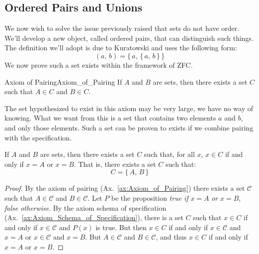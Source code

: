     \subsection{Ordered Pairs and Unions}
        We now wish to solve the issue previously raised that sets do
        not have order. We'll develop a new object, called ordered pairs, that
        can distinguish such things. The definition we'll adopt is due to
        Kuratowski and uses the following form:
        \begin{equation}
            (a,\,b)=\big\{\,a,\,\{\,a,\,b\,\}\,\big\}
        \end{equation}
        We now prove such a set exists within the framework of ZFC.
        \begin{faxiom}{Axiom of Pairing}{Axiom_of_Pairing}
            If $A$ and $B$ are sets, then there exists a set $C$ such that
            $A\in{C}$ and $B\in{C}$.
        \end{faxiom}
        The set hypothesized to exist in this axiom may be very large, we have
        no way of knowing. What we want from this is a set that contains two
        elements $a$ and $b$, and only those elements. Such a set can be proven
        to exists if we combine pairing with the specification.
        \begin{theorem}
            \label{thm:Existence_of_Set_Built_from_Two_Sets}%
            If $A$ and $B$ are sets, then there exists a set $C$ such that,
            for all $x$, $x\in{C}$ if and only if $x=A$ or $x=B$. That is,
            there exists a set $C$ such that:
            \begin{equation}
                C=\{\,A,\,B\,\}
            \end{equation}
        \end{theorem}
        \begin{proof}
            By the axiom of pairing (Ax.~\ref{ax:Axiom_of_Pairing}) there
            exists a set $\mathcal{C}$ such that $A\in\mathcal{C}$ and
            $B\in\mathcal{C}$. Let $P$ be the proposition
            \textit{true if} $x=A$ \textit{or} $x=B$, \textit{false otherwise}.
            By the axiom schema of specification
            (Ax.~\ref{ax:Axiom_Schema_of_Specification}), there is a set
            $C$ such that $x\in{C}$ if and only if $x\in\mathcal{C}$ and
            $P(x)$ is true. But then $x\in{C}$ if and only if
            $x\in\mathcal{C}$ and $x=A$ or $x\in\mathcal{C}$ and $x=B$.
            But $A\in\mathcal{C}$ and $B\in\mathcal{C}$, and thus
            $x\in{C}$ if and only if $x=A$ or $x=B$.
        \end{proof}
